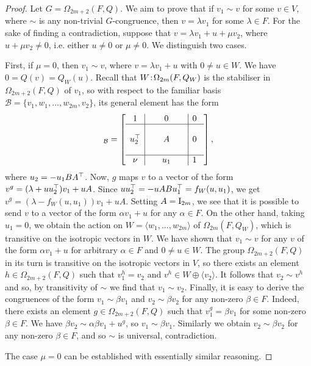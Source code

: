 \begin{proof}
	Let $G = \Omega_{2m+2}(F,Q)$. We aim to prove that if $v_1 \sim v$ for some $v \in V$, where
	$\sim$ is any non-trivial $G$-congruence, then $v = \lambda v_1$ for some $\lambda \in F$. 
	For the sake of finding a contradiction, suppose that $v = \lambda v_1 + u + \mu v_2$,
	where $u + \mu v_2 \neq 0$, i.e. either $u \neq 0$ or $\mu \neq 0$. We distinguish two cases.
	
	First, if $\mu = 0$, then $v_1 \sim v$, where $v = \lambda v_1 + u$ with $0\neq u \in W$.
	We have $0 = Q(v) = Q_W(u)$. 
	Recall that $W\mathord{{\;\!{:}\;\!}} \Omega_{2m}(F,Q_W)$ is the stabiliser in $\Omega_{2m+2}(F, Q)$ of $v_1$,
	so with respect to the familiar basis $\mathcal{B} = \{v_1, w_1 ,..., w_{2m}, v_2\}$,
	its general element has the form 
	\begin{equation*}
	[g]_{\mathcal{B}}=\left[
	    \begin{array}{c|c|c}
		1 & 0 & 0\  \\ \hline 
		 & & \\
		u_2^\T &\ \ \ \ \ A\ \ \ \ \  & 0\  \\ 
		 & & \\ \hline 
		\nu & u_1 & 1\ 
	    \end{array}
	\right],
	\end{equation*}
	where $u_2 = -u_1 BA^{\top}$. Now, $g$ maps $v$ to a vector of the form \mbox{$v^g = 
	(\lambda + u u_2^{\top}) v_1 + uA$}. Since $u u_2^{\top} = 
	-u A B u_1^{\top} = f_W(u, u_1)$, we get \mbox{$v^g = (\lambda - f_W(u, u_1))v_1 + uA$}.
	Setting $A = \mathord{\mathrm{I}}_{2m}$, we see that it is possible to send $v$ to a vector
	of the form $\alpha v_1 + u$ for any $\alpha \in F$. On the other hand, taking $u_1 = 0$,
	we obtain the action on \mbox{$W = \langle w_1, ..., w_{2m} \rangle$} 
	of $\Omega_{2m}(F,Q_W)$, which is 
	transitive on the isotropic vectors in $W$. We have shown that $v_1 \sim v$ for any $v$ of
	the form $\alpha v_1 + u$ for arbitrary $\alpha \in F$ and $0\neq u \in W$. 
	The group $\Omega_{2m+2}(F,Q)$	in 
	its turn is transitive on the isotropic vectors in $V$, so there exists an element
	\mbox{$h \in \Omega_{2m+2}(F,Q)$} such that $v_1^h = v_2$ and $v^h \in W \oplus \langle v_2 \rangle$. 
	It follows that $v_2 \sim v^h$ and so, by transitivity of $\sim$ we find that 
	$v_1 \sim v_2$. Finally, it is easy to derive the congruences of the form 
	$v_1 \sim \beta v_1$ and $v_2 \sim \beta v_2$ for any non-zero $\beta \in F$. Indeed, 
	there exists an element \mbox{$g \in  \Omega_{2m+2}(F,Q)$} such that $v_1^g = \beta v_1$ for some non-zero
	$\beta \in F$. We have 
\mbox{$\beta v_2 \sim \alpha \beta v_1 + u^g$}, so \mbox{$v_1 \sim \beta v_1$}. Similarly we obtain
	$v_2 \sim \beta v_2$ for any non-zero $\beta \in F$, and so $\sim$ is universal, contradiction.

The case $\mu = 0$ can be established with 
essentially similar reasoning. 
	
	
\end{proof}


